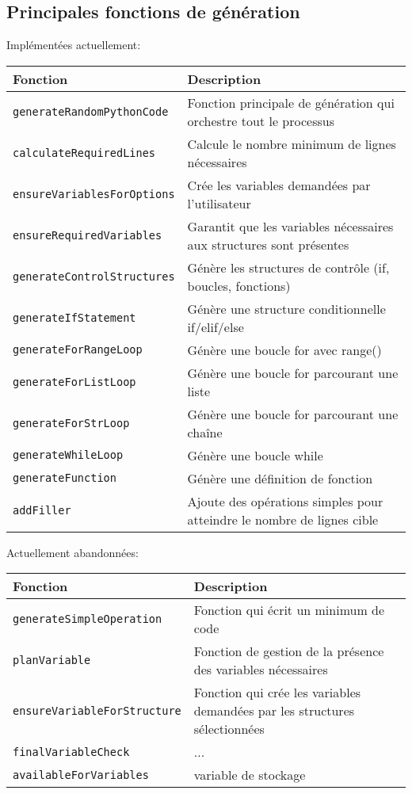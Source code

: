 \documentclass[11pt,a4paper]{article}
\begin{document}
\subsection{Principales fonctions de génération }

Implémentées actuellement:
\begin{longtable}{p{5cm}p{10cm}}
\toprule
\textbf{Fonction} & \textbf{Description} \\
\midrule
\texttt{generateRandomPythonCode} & Fonction principale de génération qui orchestre tout le processus \\
\texttt{calculateRequiredLines} & Calcule le nombre minimum de lignes nécessaires \\
\texttt{ensureVariablesForOptions} & Crée les variables demandées par l'utilisateur \\
\texttt{ensureRequiredVariables} & Garantit que les variables nécessaires aux structures sont présentes \\
\texttt{generateControlStructures} & Génère les structures de contrôle (if, boucles, fonctions) \\
\texttt{generateIfStatement} & Génère une structure conditionnelle if/elif/else \\
\texttt{generateForRangeLoop} & Génère une boucle for avec range() \\
\texttt{generateForListLoop} & Génère une boucle for parcourant une liste \\
\texttt{generateForStrLoop} & Génère une boucle for parcourant une chaîne \\
\texttt{generateWhileLoop} & Génère une boucle while \\
\texttt{generateFunction} & Génère une définition de fonction \\
\texttt{addFiller} & Ajoute des opérations simples pour atteindre le nombre de lignes cible \\
\bottomrule
\end{longtable}

Actuellement abandonnées:
\begin{longtable}{p{5cm}p{10cm}}
\toprule
\textbf{Fonction} & \textbf{Description} \\
\midrule
\texttt{generateSimpleOperation} & Fonction qui écrit un minimum de code \\
\texttt{planVariable} & Fonction de gestion de la présence des variables nécessaires \\
\texttt{ensureVariableForStructure} & Fonction qui crée les variables demandées par les structures sélectionnées \\
\texttt{finalVariableCheck} & ... \\
\texttt{availableForVariables} & variable de stockage  \\
\bottomrule
\end{longtable}
\end{document}
